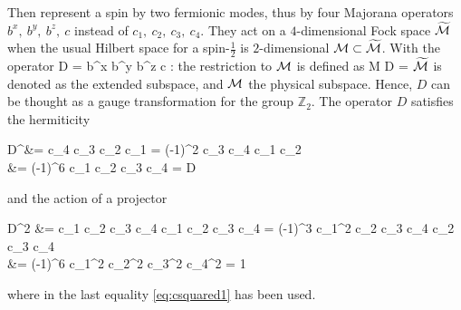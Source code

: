 		Then represent a spin by two fermionic modes, thus by four Majorana operators $b^x,\ b^y,\ b^z, \ c$ instead of $c_1,\ c_2, \ c_3,\ c_4$. They act on a $4$-dimensional Fock space $\widetilde{\mathcal M}$ when the usual Hilbert space for a spin-$\frac 1 2$ is $2$-dimensional $\mathcal M \subset \widetilde{\mathcal M}$. With the operator
		\be D = b^x b^y b^z c :  \to {} \ee
		the restriction to $\mathcal M$ is defined as
		\be \ket \xi \in \mc M \iff D \ket \xi = \ket \xi \ee
		$\widetilde{\mathcal M}$ is denoted as the extended subspace, and $\mathcal M$ the physical subspace. Hence, $D$ can be thought as a gauge transformation for the group $\mathbb Z_2$. The operator $D$ satisfies the hermiticity
		\be \begin{split} D^\dagger &= c_4 c_3 c_2 c_1 = (-1)^2 c_3 c_4 c_1 c_2 \\ &= (-1)^6 c_1 c_2 c_3 c_4 = D \end{split} \ee
		and the action of a projector
		\be \begin{split} D^2 &= c_1 c_2 c_3 c_4 c_1 c_2 c_3 c_4 = (-1)^3 c_1^2 c_2 c_3 c_4 c_2 c_3 c_4 \\ &= (-1)^6 c_1^2 c_2^2 c_3^2 c_4^2 = 1 \end{split} \label{eq:Dsquared1} \ee
		where in the last equality \eqref{eq:csquared1} has been used.

